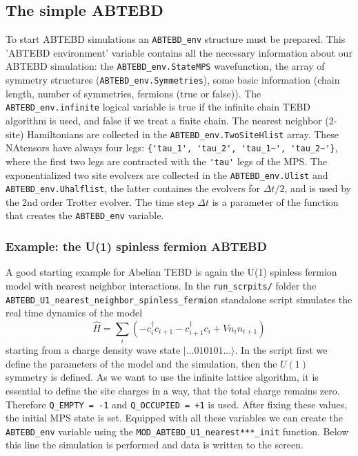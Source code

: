 \documentclass[aps,prb,twocolumn,showpacs,preprintnumbers,amsmath,amssymb, superscriptaddressm, nofootinbib]{revtex4-2}   %
\begin{document}
\subsection{The simple ABTEBD}
To start ABTEBD simulations an \verb|ABTEBD_env| structure must be prepared. This 'ABTEBD environment' variable contains all the necessary information about our ABTEBD simulation: the \verb|ABTEBD_env.StateMPS| wavefunction, the array of symmetry structures (\verb|ABTEBD_env.Symmetries|), some basic information (chain length, number of symmetries, fermions (true or false)). The \verb|ABTEBD_env.infinite| logical variable is true if the infinite chain TEBD algorithm is used\cite{Vidal_2007}, and false if we treat a finite chain. The nearest neighbor (2-site) Hamiltonians are collected in the \verb|ABTEBD_env.TwoSiteHlist| array. These NAtensors have always four legs: \verb|{'tau_1', 'tau_2', 'tau_1~', 'tau_2~'}|, where the first two legs are contracted with the \verb|'tau'| legs of the MPS. The exponentialized two site evolvers are collected in the  \verb|ABTEBD_env.Ulist| and \verb|ABTEBD_env.Uhalflist|, the latter containes the evolvers for $\Delta t / 2$, and is used by the 2nd order Trotter evolver. The time step $\Delta t$ is a parameter of the function that creates the \verb|ABTEBD_env| variable.

\subsubsection{Example: the U(1) spinless fermion ABTEBD}
A good starting example for Abelian TEBD is again the U(1) spinless fermion model with nearest neighbor interactions. In the \verb|run_scrpits/| folder the \verb|ABTEBD_U1_nearest_neighbor_spinless_fermion| standalone script simulates the real time dynamics of the model 
\begin{equation}
 \hat{H} = \sum_i \left( - c^\dagger_i c_{i+1} - c^\dagger_{i+1} c_i + V n_i n_{i+1}   \right)
\end{equation}
starting from a charge density wave state $|...010101...\rangle$.
In the script first we define the parameters of the model and the simulation, then the $U(1)$ symmetry is defined. As we want to use the infinite lattice algorithm, it is essential to define the site charges in a way, that the total charge remains zero. Therefore \verb|Q_EMPTY = -1| and \verb|Q_OCCUPIED = +1| is used. After fixing these values, the initial MPS state is set. Equipped with all these variables we can create the \verb|ABTEBD_env| variable using the \verb|MOD_ABTEBD_U1_nearest***_init| function. Below this line the simulation is performed and data is written to the screen. 
\end{document}
